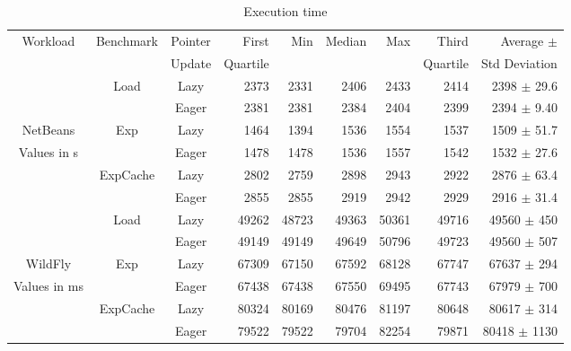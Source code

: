 \documentclass[sigplan,10pt,review,anonymous]{acmart}\settopmatter{printfolios=true,printccs=false,printacmref=false}
\begin{document}
\begin{table} [bht]
\centering
\caption{Execution time\vspace{-0.2cm}}
\begin{tabular}{c|c|c|r|r|r|r|r|r}
	 \multirow{2}{*}{Workload} & \multirow{2}{*}{Benchmark} 	& Pointer  		& First			& \multirow{2}{*}{Min} &  \multirow{2}{*}{Median} & \multirow{2}{*}{Max} & Third 		& Average $\pm$ \\
						&					      	& Update 		& \small{Quartile}	& 				  & 					  & 				    & \small{Quartile} 	& \small{Std Deviation} \\
	\hline
						& \multirow{2}{*}{Load} 	 	& Lazy		& 2373	& 2331	& 2406	& 2433 & 2414	& 2398 $\pm$ 29.6 \\
						&						& Eager		& 2381	& 2381	& 2384	& 2404 & 2399	& 2394 $\pm$ 9.40 \\
	NetBeans				& \multirow{2}{*}{Exp} 		& Lazy		& 1464	& 1394	& 1536	&1554  & 1537	& 1509 $\pm$ 51.7 \\
	\small{Values in s}		&					  	& Eager		& 1478	& 1478	& 1536	& 1557 & 1542	& 1532 $\pm$ 27.6 \\
						& \multirow{2}{*}{ExpCache}	& Lazy		& 2802	& 2759	& 2898	& 2943 & 2922	& 2876 $\pm$ 63.4 \\
						&					  	& Eager		& 2855	& 2855	& 2919	& 2942 & 2929	& 2916 $\pm$ 31.4 \\
	\hline
						& \multirow{2}{*}{Load} 	 	& Lazy		& 49262	& 48723			& 49363	& 50361	& 49716		& 49560 $\pm$ 450 \\
						&						& Eager		& 49149	& 49149			& 49649	& 50796	& 49723		& 49560 $\pm$ 507 \\
	WildFly				& \multirow{2}{*}{Exp} 		& Lazy		& 67309	& 67150			& 67592	& 68128	& 67747		& 67637 $\pm$ 294 \\
	\small{Values in ms}	&					  		& Eager		& 67438	& 67438			& 67550	& 69495	& 67743		& 67979 $\pm$ 700\\
						& \multirow{2}{*}{ExpCache} 	& Lazy		& 80324	& 80169			& 80476	& 81197	& 80648		& 80617 $\pm$ 314 \\
						&					  	& Eager		& 79522	& 79522			& 79704	& 82254	& 79871		& 80418 $\pm$ 1130 \\
	\end{tabular} 
\label{tab:execTimeTable}
\vspace{-0.1cm}
\end{table}
\end{document}
